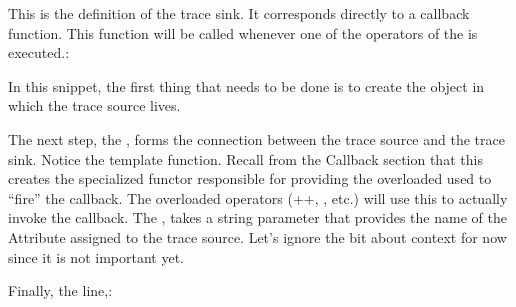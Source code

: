 \documentclass[letterpaper,10pt,english]{sphinxmanual}
\renewcommand{\sphinxcode}[1]{\texttt{\small{#1}}}
\begin{document}
This is the definition of the trace sink. It corresponds directly to a callback
function. This function will be called whenever one of the operators of the
\sphinxcode{} is executed.:

\begin{sphinxVerbatim}[commandchars=\\\{\}]
    \PYG{p}{[}\PYG{p}{]}
      

    

    
\end{sphinxVerbatim}

In this snippet, the first thing that needs to be done is to create the object
in which the trace source lives.

The next step, the \sphinxcode{}, forms the connection between
the trace source and the trace sink. Notice the \sphinxcode{} template
function. Recall from the Callback section that this creates the specialized
functor responsible for providing the overloaded \sphinxcode{} used to “fire”
the callback. The overloaded operators (++, \textendash{}, etc.) will use this
\sphinxcode{} to actually invoke the callback. The
\sphinxcode{}, takes a string parameter that provides the name
of the Attribute assigned to the trace source. Let’s ignore the bit about
context for now since it is not important yet.

Finally, the line,:

\begin{sphinxVerbatim}[commandchars=\\\{\}]
  
\end{sphinxVerbatim}
\end{document}
